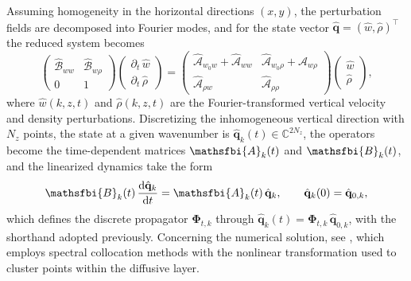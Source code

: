 Assuming homogeneity in the horizontal directions \((x,y)\), the perturbation fields are decomposed into Fourier modes, and for the state vector \(\hat{\boldsymbol{q}}=(\hat{w},\hat{\rho})^{\top}\) the reduced system becomes
\begin{equation}
    \label{eq:vd_lti_dz_k}
    \begin{pmatrix}
        \widehat{\mathscr{B}}_{ww} & \widehat{\mathscr{B}}_{w\rho} \\
        0 & 1
    \end{pmatrix}
    \begin{pmatrix}
        \partial_t\, \hat{w} \\[4pt]
        \partial_t\,\hat{\rho}
    \end{pmatrix}
    =
    \begin{pmatrix}
        \widehat{\mathscr{A}}_{w_0w}+\widehat{\mathscr{A}}_{ww} & \widehat{\mathscr{A}}_{w_0\rho}+\widehat{\mathscr{A}}_{w\rho} \\[4pt]
        \widehat{\mathscr{A}}_{\rho w} & \widehat{\mathscr{A}}_{\rho\rho}
    \end{pmatrix}
    \begin{pmatrix}
        \hat{w} \\[4pt]
        \hat{\rho}
    \end{pmatrix},
\end{equation}
where \(\hat{w}(k,z,t)\) and \(\hat{\rho}(k,z,t)\) are the Fourier-transformed vertical velocity and density perturbations. Discretizing the inhomogeneous vertical direction with \(N_z\) points, the state at a given wavenumber is \(\hat{\mathbf{q}}_{k}(t)\in\mathbb{C}^{2N_z}\), the operators become the time-dependent matrices \(\mathsfbi{A}_{k}(t)\) and \(\mathsfbi{B}_{k}(t)\), and the linearized dynamics take the form
\begin{equation}
    \label{eq:vd_semidiscrete_system}
    \mathsfbi{B}_{k}(t)\,\difft{\hat{\mathbf{q}}_{k}}{t}
    =
    \mathsfbi{A}_{k}(t)\,\hat{\mathbf{q}}_{k},
    \qquad
    \hat{\mathbf{q}}_{k}(0)=\hat{\mathbf{q}}_{0,k},
\end{equation}
which defines the discrete propagator \(\boldsymbol{\Phi}_{t,k}\) through \(\hat{\mathbf{q}}_{k}(t)=\boldsymbol{\Phi}_{t,k}\,\hat{\mathbf{q}}_{0,k}\), with the shorthand adopted previously. Concerning the numerical solution, see \citet{kola-israel-towne-2026}, which employs spectral collocation methods with the nonlinear transformation used to cluster points within the diffusive layer.
